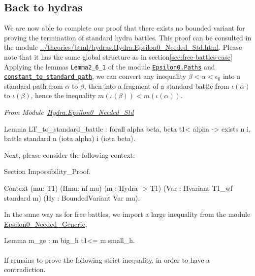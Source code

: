 \subsection{Back to hydras}
\label{sec:standard-battles-cases}
We are now able to complete our proof that there exists no bounded variant for proving the termination of standard hydra battles. This proof can
be consulted in the module 
\url{../theories/html/hydras.Hydra.Epsilon0_Needed_Std.html}.
Please note that it has the same global structure as in section\ref{sec:free-battles-case} 
Applying the  lemmas  \texttt{Lemma2\_6\_1} of the module 
\href{../theories/html/hydras.Epsilon0.Paths.html\#Lemma2_6_1}%
{\texttt{Epsilon0.Paths}}   and 
\href{../theories/html/hydras.Epsilon0.Paths.html\#constant_to_standard_path}%
{\texttt{constant\_to\_standard\_path}},
we can convert any inequality $\beta<\alpha<\epsilon_0$ into a standard path from
$\alpha$ to  $\beta$, then into a fragment of a standard battle from 
$\iota(\alpha)$ to $\iota(\beta)$, hence the inequality $m(\iota(\beta))<m(\iota(\alpha))$.


\vspace{4pt}
\emph{From Module~\href{../theories/html/hydras.Hydra.Epsilon0_Needed_Std.html\#LT_to_standard_battle}{Hydra.Epsilon0\_Needed\_Std}}

\begin{Coqsrc}
Lemma LT_to_standard_battle :
    forall alpha beta,
      beta t1< alpha ->
      exists n i,  battle standard  n (iota alpha) i (iota beta).
\end{Coqsrc}


Next, please consider the following context:

\begin{Coqsrc}
Section Impossibility_Proof.

Context (mu: T1)
          (Hmu: nf mu)
          (m : Hydra -> T1)
          (Var : Hvariant  T1_wf standard m)
          (Hy : BoundedVariant Var mu).
 \end{Coqsrc}

In the same way as for free battles, we import a large inequality 
from 
the module \href{../theories/html/hydras.Hydra.Epsilon0_Needed_Generic.html}{Epsilon0\_Needed\_Generic}.


\begin{Coqsrc}
 Lemma m_ge : m big_h t1<= m small_h.
\end{Coqsrc}

\paragraph*{} If remains to prove the following strict inequality, in order to have a contradiction.

